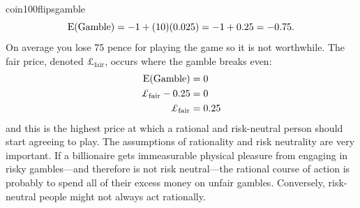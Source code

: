 \begin{answer}{coin100flipsgamble}
\[
  \operatorname{\mathrm{E}}(\text{Gamble}) = -1 + (10)(0.025) = -1 + 0.25 = -0.75
  \text{.}
\]
On average you lose 75 pence for playing the game so it is not worthwhile.
The fair price, denoted $\pounds_{\text{fair}}$, occurs where the gamble breaks even:
\begin{align*}
  \E(\text{Gamble})     &=  0    \\
  \pounds_{\text{fair}} - 0.25 &=  0    \\
  \pounds_{\text{fair}}        &=  0.25
\end{align*}
and this is the highest price at which a
rational and risk-neutral person should start agreeing to play.
The assumptions of rationality and risk neutrality are very important.
If a billionaire gets immeasurable physical pleasure from engaging in risky gambles---and therefore is not risk neutral---the rational course of action is probably to spend all of their excess money on unfair gambles.
Conversely, risk-neutral people might not always act rationally.

\end{answer}
